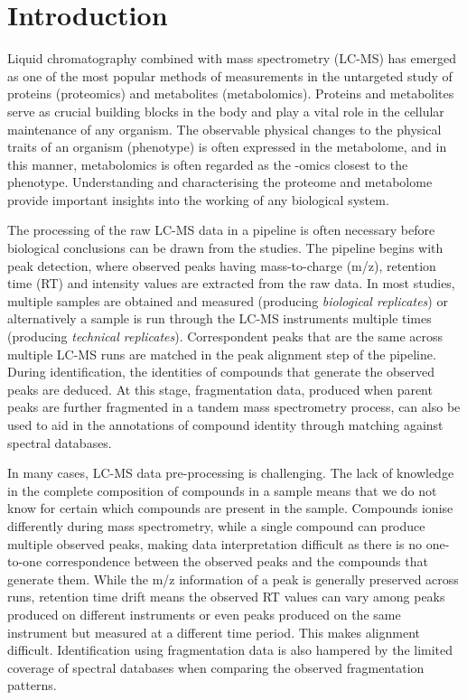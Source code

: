 \chapter{Introduction}
\label{c:intro}

Liquid chromatography combined with mass spectrometry (LC-MS) has emerged as one of the most popular methods of measurements in the untargeted study of proteins (proteomics) and metabolites (metabolomics). Proteins and metabolites serve as crucial building blocks in the body and play a vital role in the cellular maintenance of any organism. The observable physical changes to the physical traits of an organism (phenotype) is often expressed in the metabolome, and in this manner, metabolomics is often regarded as the -omics closest to the phenotype. Understanding and characterising the proteome and metabolome provide important insights into the working of any biological system.

The processing of the raw LC-MS data in a pipeline is often necessary before biological conclusions can be drawn from the studies. The pipeline begins with peak detection, where observed peaks having mass-to-charge (m/z), retention time (RT) and intensity values are extracted from the raw data. In most studies, multiple samples are obtained and measured (producing \emph{biological replicates}) or alternatively a sample is run through the LC-MS instruments multiple times (producing \emph{technical replicates}). Correspondent peaks that are the same across multiple LC-MS runs are matched in the peak alignment step of the pipeline. During identification, the identities of compounds that generate the observed peaks are deduced. At this stage, fragmentation data, produced when parent peaks are further fragmented in a tandem mass spectrometry process, can also be used to aid in the annotations of compound identity through matching against spectral databases. 

In many cases, LC-MS data pre-processing is challenging. The lack of knowledge in the complete composition of compounds in a sample means that we do not know for certain which compounds are present in the sample. Compounds ionise differently during mass spectrometry, while a single compound can produce multiple observed peaks, making data interpretation difficult as there is no one-to-one correspondence between the observed peaks and the compounds that generate them. While the m/z information of a peak is generally preserved across runs, retention time drift means the observed RT values can vary among peaks produced on different instruments or even peaks produced on the same instrument but measured at a different time period. This makes alignment difficult. Identification using fragmentation data is also hampered by the limited coverage of spectral databases when comparing the observed fragmentation patterns. 

